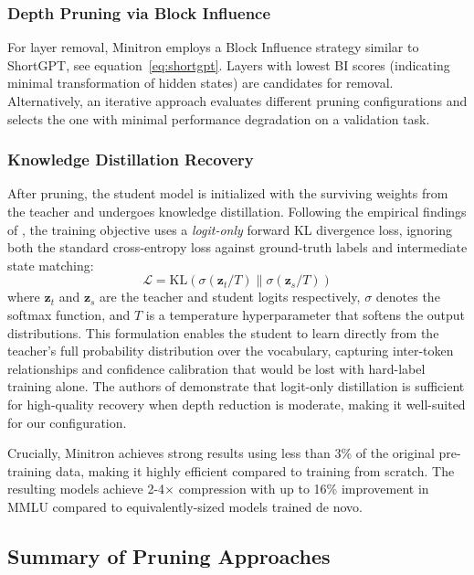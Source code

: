 \documentclass{article}
\begin{document}
\subsubsection{Depth Pruning via Block Influence}

For layer removal, Minitron employs a Block Influence strategy similar to ShortGPT, see equation~\eqref{eq:shortgpt}.
Layers with lowest BI scores (indicating minimal transformation of hidden states) are candidates for removal. Alternatively, an iterative approach evaluates different pruning configurations and selects the one with minimal performance degradation on a validation task.

\subsubsection{Knowledge Distillation Recovery}

After pruning, the student model is initialized with the surviving weights from the teacher and undergoes knowledge distillation. Following the empirical findings of \cite{muralidharan2024compact}, the training objective uses a \emph{logit-only} forward KL divergence loss, ignoring both the standard cross-entropy loss against ground-truth labels and intermediate state matching:
\begin{equation}
    \mathcal{L} = \text{KL}\left(\sigma(\mathbf{z}_t/T) \| \sigma(\mathbf{z}_s/T)\right)
\end{equation}
where $\mathbf{z}_t$ and $\mathbf{z}_s$ are the teacher and student logits respectively, $\sigma$ denotes the softmax function, and $T$ is a temperature hyperparameter that softens the output distributions. This formulation enables the student to learn directly from the teacher's full probability distribution over the vocabulary, capturing inter-token relationships and confidence calibration that would be lost with hard-label training alone. The authors of \cite{muralidharan2024compact} demonstrate that logit-only distillation is sufficient for high-quality recovery when depth reduction is moderate, making it well-suited for our configuration.

Crucially, Minitron achieves strong results using less than 3\% of the original pre-training data, making it highly efficient compared to training from scratch. The resulting models achieve 2-4$\times$ compression with up to 16\% improvement in MMLU compared to equivalently-sized models trained de novo.

\subsection{Summary of Pruning Approaches}
\end{document}

